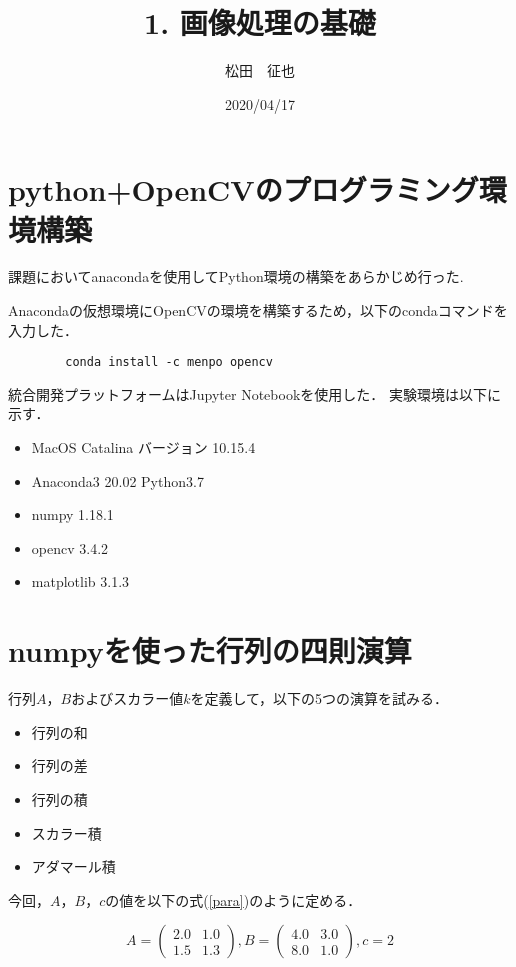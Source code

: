 \documentclass{article}
\title{1. 画像処理の基礎}
\author{松田　征也}
\date{2020/04/17}
\begin{document}
\maketitle

\section{python+OpenCVのプログラミング環境構築}
    
    課題においてanacondaを使用してPython環境の構築をあらかじめ行った.
    
    Anacondaの仮想環境にOpenCVの環境を構築するため，以下のcondaコマンドを入力した．
    
    \begin{verbatim}
        conda install -c menpo opencv
    \end{verbatim}
    
    統合開発プラットフォームはJupyter Notebookを使用した．
    実験環境は以下に示す．
    
    \begin{itemize}
        \item MacOS Catalina バージョン 10.15.4
        \item Anaconda3 20.02 Python3.7
        \item numpy 1.18.1
        \item opencv 3.4.2
        \item matplotlib 3.1.3
    \end{itemize}

\section{numpyを使った行列の四則演算}

行列$A$，$B$およびスカラー値$k$を定義して，以下の5つの演算を試みる．

\begin{itemize}
    \item 行列の和
    \item 行列の差
    \item 行列の積
    \item スカラー積
    \item アダマール積
\end{itemize}

今回，$A$，$B$，$c$の値を以下の式(\ref{para})のように定める．

\begin{equation}
\label{para}
    A = \left(
    \begin{array}{cc}
      2.0 & 1.0 \\
      1.5 & 1.3
    \end{array}
  \right), 
   B = \left(
    \begin{array}{cc}
      4.0 & 3.0 \\
      8.0 & 1.0 
    \end{array}
  \right),
  c=2
\end{equation}
\end{document}

